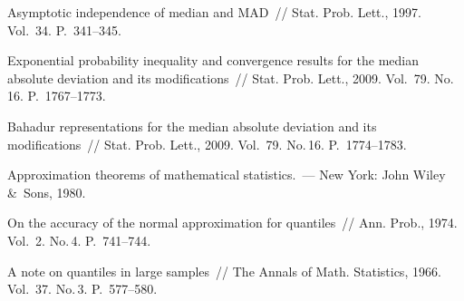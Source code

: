 \begin{multicols}{2}
{{\begin{thebibliography}{9}
 Asymptotic independence of median and MAD~// 
Stat. Prob. Lett., 1997. Vol.~34. P.~341--345.


 Exponential probability inequality and convergence results for
the median absolute deviation and its modifications~// Stat. Prob. Lett.,
2009. Vol.~79. No.\,16. P.~1767--1773.

 Bahadur representations for the median absolute deviation
and its modifications~// Stat. Prob. Lett., 2009. Vol.~79. No.\,16. P.~1774--1783.

 Approximation theorems of mathematical statistics.~--- 
New York: John Wiley \&~Sons, 1980.


\label{end\stat}

 On the accuracy of the normal approximation for quantiles~// Ann.
Prob., 1974. Vol.~2. No.\,4. P.~741--744.

 A note on quantiles in large samples~// 
The Annals of Math. Statistics, 1966. Vol.~37. No.\,3. P.~577--580.

 \end{thebibliography}
}
}


\end{multicols}       
